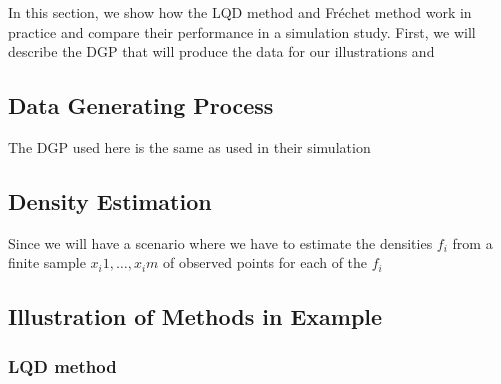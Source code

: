In this section, we show how the LQD method and Fréchet method work in practice and
compare their performance in a simulation study. First, we will describe the DGP that
will produce the data for our illustrations and

\subsection{Data Generating Process}
\label{sec:app_dgp}
The DGP used here is the same as \textcite{PetersenMüller2019} used in their simulation

\subsection{Density Estimation}
\label{sec:app_density_estimation}
Since we will have a scenario where we have to estimate the densities $f_i$ from a finite sample
$x_i1,\dots, x_im$ of observed points for each of the $f_i$

\subsection{Illustration of Methods in Example}
\label{sec:app_illustration}

\subsubsection{LQD method}
\label{sec:app_lqd}

